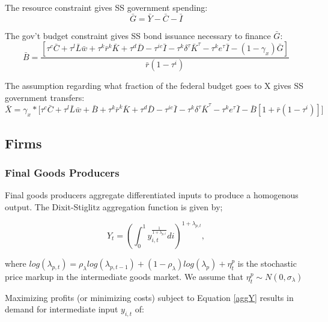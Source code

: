 \documentclass[article,11pt,letterpaper,fleqn]{article}
\theoremstyle{definition}
\numberwithin{equation}{section}
\begin{document}
The resource constraint gives SS government spending:
\begin{equation}
\bar{G} = \bar{Y}-\bar{C}-\bar{I}
\end{equation}

The gov't budget constraint gives SS bond issuance necessary to finance $\bar{G}$:
\begin{equation}
\bar{B} = \frac{\left[\tau^{c}\bar{C} + \tau^{l}\bar{L}\bar{w} + \tau^{k}\bar{r}^{k}\bar{K} + \tau^{d}\bar{D} - \tau^{ic}\bar{I} - \tau^{k}\delta^{\tau}\bar{K}^{\tau} - \tau^{k}e^{\tau}\bar{I}-(1-\gamma_{x})\bar{G}\right]}{\bar{r}(1-\tau^{i})}
\end{equation}

The assumption regarding what fraction of the federal budget goes to X gives SS government transfers:
\begin{equation}
\bar{X} = \gamma_{x}*\Biggl[\tau^{c}\bar{C} + \tau^{l}\bar{L}\bar{w} + \bar{B} + \tau^{k}\bar{r}^{k}\bar{K} + \tau^{d}\bar{D} - \tau^{ic}\bar{I} - \tau^{k}\delta^{\tau}\bar{K}^{\tau} - \tau^{k}e^{\tau}\bar{I} - \bar{B}\left[1+\bar{r}(1-\tau^{i})\right]\Biggr]
\end{equation}









\subsection{Firms}

	\subsubsection{Final Goods Producers}

Final goods producers aggregate differentiated inputs to produce a homogenous output.  The Dixit-Stiglitz aggregation function is given by;

\begin{equation}
\label{aggY}
Y_{t}=\left(\int_{0}^{1} y_{i,t}^{\frac{1}{1+\lambda_{p,t}}}di\right)^{1+\lambda_{p,t}},
\end{equation}

\noindent\noindent where $log(\lambda_{p,t})=\rho_{\lambda}log(\lambda_{p,t-1})+(1-\rho_{\lambda})log(\lambda_{p})+\eta_{t}^{p}$ is the stochastic price markup in the intermediate goods market.  We assume that $\eta_{t}^{p}\sim N(0,\sigma_\lambda)$

Maximizing profits (or minimizing costs) subject to Equation \ref{aggY} results in demand for intermediate input $y_{i,t}$ of:
\end{document}
